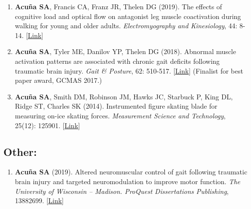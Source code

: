 \documentclass[letterpaper, 10pt]{article}
\begin{document}
\begin{enumerate}
    \item \textbf{Acuña SA}, Francis CA, Franz JR, Thelen DG (2019). The effects of cognitive load and optical ﬂow on antagonist leg muscle coactivation during walking for young and older adults. \textit{Electromyography and Kinesiology}, 44: 8-14. [\href{https://www.sciencedirect.com/science/article/abs/pii/S1050641118303122}{Link}]
    \item \textbf{Acuña SA}, Tyler ME, Danilov YP, Thelen DG (2018). Abnormal muscle activation patterns are associated with chronic gait deﬁcits following traumatic brain injury. \textit{Gait \& Posture}, 62: 510-517. [\href{https://www.sciencedirect.com/science/article/abs/pii/S096663621830359X}{Link}] (Finalist for best paper award, GCMAS 2017.)
    \item \textbf{Acuña SA}, Smith DM, Robinson JM, Hawks JC, Starbuck P, King DL, Ridge ST, Charles SK (2014). Instrumented ﬁgure skating blade for measuring on-ice skating forces. \textit{Measurement Science and Technology}, 25(12): 125901. [\href{https://iopscience.iop.org/article/10.1088/0957-0233/25/12/125901}{Link}]
\end{enumerate}



\subsection{Other:}
\begin{enumerate}
    \item \textbf{Acuña SA} (2019). Altered neuromuscular control of gait following traumatic brain injury and targeted neuromodulation to improve motor function. \textit{The University of Wisconsin -- Madison. ProQuest Dissertations Publishing}, 13882699. [\href{https://www.proquest.com/docview/2229834647}{Link}]
\end{enumerate}
\end{document}
